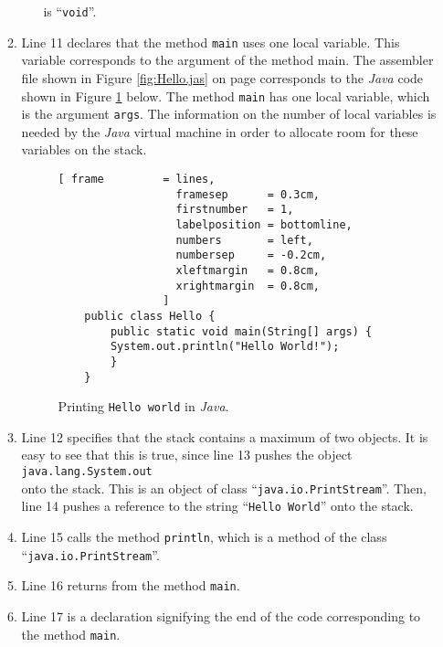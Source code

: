 \begin{enumerate}
\begin{enumerate}
\begin{enumerate}
              is ``\texttt{void}''.
       \end{enumerate}
  \item Line 11 declares that the method \texttt{main} uses one local variable.  This variable
        corresponds to the argument of the method main.  The assembler file shown in Figure
        \ref{fig:Hello.jas} on page \pageref{fig:Hello.jas} corresponds to the \textsl{Java} code
        shown in Figure \ref{fig:Hello.java} below.  The method \texttt{main} has one local
        variable, which is the argument \texttt{args}.
        The information on the number of local variables is needed by the \textsl{Java} virtual
        machine in order to allocate room for these variables on the stack.

\begin{figure}[!ht]
\centering
\begin{Verbatim}[ frame         = lines, 
                  framesep      = 0.3cm, 
                  firstnumber   = 1,
                  labelposition = bottomline,
                  numbers       = left,
                  numbersep     = -0.2cm,
                  xleftmargin   = 0.8cm,
                  xrightmargin  = 0.8cm,
                ]
    public class Hello {
        public static void main(String[] args) {
    	System.out.println("Hello World!");
        }
    }
\end{Verbatim}
\vspace*{-0.3cm}
\caption{Printing \texttt{Hello world} in \textsl{Java}.} 
\label{fig:Hello.java}
\end{figure}

  \item Line 12 specifies that the stack contains a maximum of two objects.  It is easy to see that
        this is true, since line 13 pushes the object
        \\[0.2cm]
        \hspace*{1.3cm}
        \texttt{java.lang.System.out}
        \\[0.2cm]
        onto the stack.  This is an object of class ``\texttt{java.io.PrintStream}''.
        Then, line 14 pushes a reference to the string ``\texttt{Hello World}'' onto the stack.
  \item Line 15 calls the method \texttt{println}, which is a method of the class
        ``\texttt{java.io.PrintStream}''.  
  \item Line 16 returns from the method \texttt{main}.
  \item Line 17 is a declaration signifying the end of the code corresponding to the method 
        \texttt{main}.
  \end{enumerate}
\end{enumerate}
